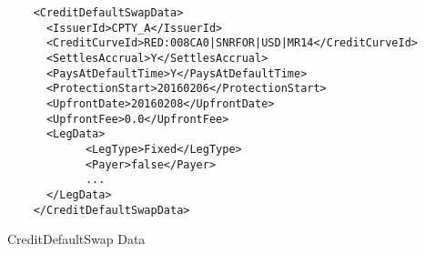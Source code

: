 \begin{listing}[H]
\begin{verbatim}
    <CreditDefaultSwapData>
      <IssuerId>CPTY_A</IssuerId>
      <CreditCurveId>RED:008CA0|SNRFOR|USD|MR14</CreditCurveId>
      <SettlesAccrual>Y</SettlesAccrual>
      <PaysAtDefaultTime>Y</PaysAtDefaultTime>
      <ProtectionStart>20160206</ProtectionStart>
      <UpfrontDate>20160208</UpfrontDate>
      <UpfrontFee>0.0</UpfrontFee>
      <LegData>
            <LegType>Fixed</LegType>
            <Payer>false</Payer>
            ...
      </LegData>
    </CreditDefaultSwapData>
\end{verbatim}
\caption{CreditDefaultSwap Data}
\label{lst:cdsdata}
\end{listing}